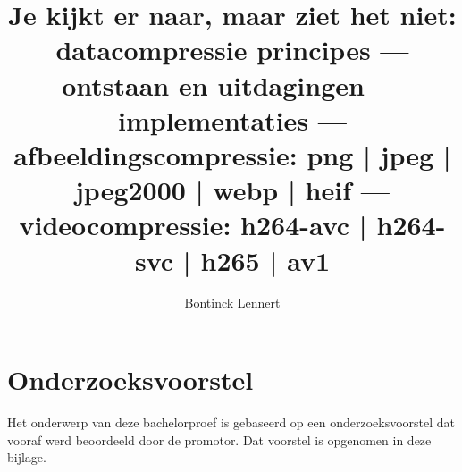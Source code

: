 \documentclass{bachproef-tin}
\title{Je kijkt er naar, maar ziet het niet: datacompressie	principes --- ontstaan en uitdagingen --- implementaties --- \gls{afbeeldingscompressie}: \gls{png} | \gls{jpeg} | \gls{jpeg2000} | \gls{webp} | \gls{heif} --- \gls{videocompressie}:  \gls{h264-avc} | \gls{h264-svc} | \gls{h265} | \gls{av1}}
\author{Bontinck Lennert}
\begin{document}


\inserttitlepage

\usechapterimagefalse



\pagestyle{empty} %
\tableofcontents  %
\cleardoublepage  %
\pagestyle{fancy} %

















\appendix
\renewcommand{\chaptername}{Appendix}


\chapter{Onderzoeksvoorstel}

Het onderwerp van deze bachelorproef is gebaseerd op een onderzoeksvoorstel dat vooraf werd beoordeeld door de promotor. Dat voorstel is opgenomen in deze bijlage.



%


\nocite{*}
\printbibliography[heading=bibintoc]
\end{document}
